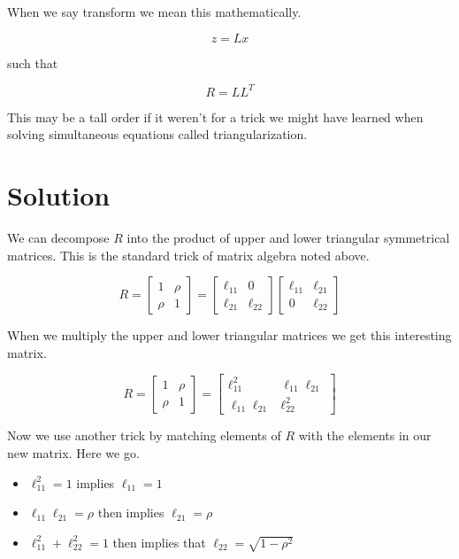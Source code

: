 \documentclass[
]{book}
\providecommand{\tightlist}{%
  \setlength{\itemsep}{0pt}\setlength{\parskip}{0pt}}
\begin{document}
When we say transform we mean this mathematically.

\[
z = Lx
\]

such that

\[
R = LL^T
\]

This may be a tall order if it weren't for a trick we might have learned when solving simultaneous equations called triangularization.

\hypertarget{solution}{%
\section{Solution}\label{solution}}

We can decompose \(R\) into the product of upper and lower triangular symmetrical matrices. This is the standard trick of matrix algebra noted above.

\[
R = 
\begin{bmatrix}
1 & \rho \\
\rho & 1
\end{bmatrix}
=
\begin{bmatrix}
\ell_{11} & 0 \\
\ell_{21} & \ell_{22}
\end{bmatrix}
\begin{bmatrix}
\ell_{11} & \ell_{21} \\
0 & \ell_{22}
\end{bmatrix}
\]

When we multiply the upper and lower triangular matrices we get this interesting matrix.

\[
R =
\begin{bmatrix}
1 & \rho \\
\rho & 1
\end{bmatrix}
=
\begin{bmatrix}
\ell_{11}^2 & \ell_{11}\ell_{21} \\
\ell_{11}\ell_{21} & \ell_{22}^2
\end{bmatrix}
\]

Now we use another trick by matching elements of \(R\) with the elements in our new matrix. Here we go.

\begin{itemize}
\tightlist
\item
  \(\ell_{11}^2 = 1\) implies \(\ell_{11}= 1\)
\item
  \(\ell_{11}\ell_{21} = \rho\) then implies \(\ell_{21} = \rho\)
\item
  \(\ell_{11}^2 + \ell_{22}^2 = 1\) then implies that \(\ell_{22} = \sqrt{1 - \rho^2}\)
\end{itemize}
\end{document}
